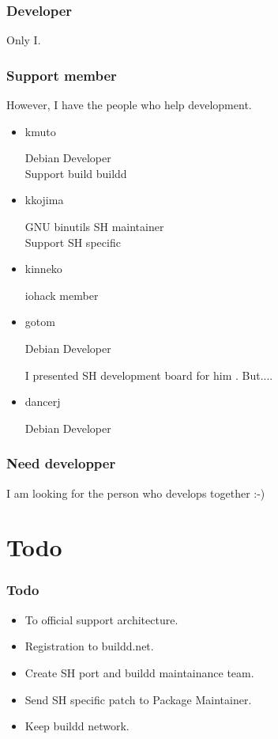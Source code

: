 \documentclass[cjk,dvipdfm,12pt]{beamer}
\begin{document}
\begin{frame}
 \frametitle{Developer}
  Only I.
 
\end{frame}

\begin{frame}
 \frametitle{Support member}
  However, I have the people who help development. 
 \begin{itemize}
  \item kmuto

	Debian Developer \\
	Support build buildd

  \item kkojima

	GNU binutils SH maintainer \\
	Support SH specific

  \item kinneko

	iohack member
	
  \item gotom
 
 	Debian Developer

	I presented SH development board for him . But....

  \item dancerj

	Debian Developer

	
 \end{itemize}
\end{frame}


\begin{frame}
 \frametitle{Need developper}
 I am looking for the person who develops together :-)

\end{frame}


\section{Todo}
\begin{frame}
 \frametitle{Todo}

   \begin{itemize}
    \item To official support architecture.
    \item Registration to buildd.net.
    \item Create SH port and buildd maintainance team.
    \item Send SH specific patch to Package Maintainer.
    \item Keep buildd network.
   \end{itemize}
\end{frame}
\end{document}
